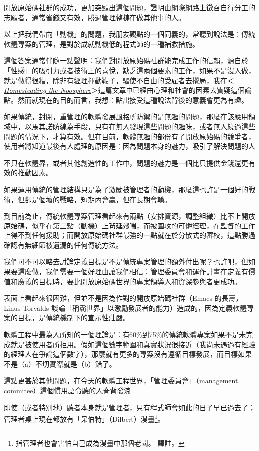 \documentclass[10pt, b5paper]{book}
\makeatletter
\newcommand*{\shifttext}[2]{%
  \settowidth{\@tempdima}{#2}%
  \makebox[\@tempdima]{\hspace*{#1}#2}%
}
\makeatother
\begin{document}
開放原始碼社群的成功，更加突顯出這個問題，證明由網際網路上徵召自行分工的志願者，通常省錢又有效，勝過管理整棟在做其他事的人。

以上把我們帶向「動機」的問題，我朋友觀點的一個同義的，常聽到說法是︰傳統軟體專案的管理，是對於成就動機低的程式師的一種補救措施。

這個答案通常伴隨一點聲明︰我們對開放原始碼社群能完成工作的信賴，源自於「性感」的吸引力或者技術上的喜悅，缺乏這兩個要素的工作，如果不是沒人做，就是做得很糟，除非有經理揮動鞭子，驅使不自由的受雇者去攪局，我在＜\href{http://www.tuxedo.org/~esr/magic-cauldron/}{\emph{Homesteading
the
Noosphere}}＞這篇文章中已經由心理和社會的因素去質疑這個論點。然而就現在的目的而言，我想︰點出接受這種說法背後的意義會更為有趣。

如果傳統，封閉，重管理的軟體發展風格所防禦的是無趣的問題，那麼在該應用領域中，以馬其諾防線為手段，只有在無人發現這些問題的趣味，或者無人繞過這些問題的情況下，才算有效。但在目前，軟體無趣的部份有了開放原始碼的競爭者，使用者將知道最後有人處理的原因是︰因為問題本身的魅力，吸引了解決問題的人
\shifttext{1pt}{---}\shifttext{-1pt}{---}
不只在軟體界，或者其他創造性的工作中，問題的魅力是一個比只提供金錢還更有效的推動因素。

如果運用傳統的管理結構只是為了激勵被管理者的動機，那麼這也許是一個好的戰術，但卻是個壞的戰略，短期內會贏，但在長期會輸。

到目前為止，傳統軟體專案管理看起來有兩點（安排資源，調整組織）比不上開放原始碼，似乎在第三點（動機）上茍延殘喘，而被圍攻的可憐經理，在監督的工作上得不到任何援助；而開放原始碼社群最強的一點就在於分散式的審校，這點勝過確認有無細節被遺漏的任何傳統方法。

我們可不可以略去討論定義目標是不是傳統專案管理的額外付出呢？也許吧，但如果要這麼做，我們需要一個好理由讓我們相信︰管理委員會和運作計畫在定義有價值和廣義的目標時，要比開放原始碼世界的專案領導人和資深參與者更成功。

表面上看起來很困難，但並不是因為作對的開放原始碼社群（Emacs 的長壽，Linus
Torvalds
談論「稱霸世界」以激勵發展者的能力）造成的，因為定義軟體專案的目標，是傳統機制下的宣示性莊嚴。

軟體工程中最為人所知的一個理論是︰有60\%到75\%的傳統軟體專案如果不是未完成就是被使用者所拒用。假如這個數字範圍和真實狀況很接近（我尚未遇過有經驗的經理人在爭論這個數字），那麼就有更多的專案沒有遵循目標發展，而目標如果不是（a）不切實際就是（b）錯了。

這點更甚於其他問題，在今天的軟體工程世界，「管理委員會」（management
commitee）這個慣用語令聽的人脊背發涼 \shifttext{1pt}{---}\shifttext{-1pt}{---}
即使（或者特別地）聽者本身就是管理者，只有程式師會如此的日子早已過去了；管理者桌上現在都放有「呆伯特」（Dilbert）漫畫\footnote{指管理者也會害怕自己成為漫畫中那個老闆。
  \shifttext{1pt}{---}\shifttext{-1pt}{---} 譯註。}。
\end{document}
